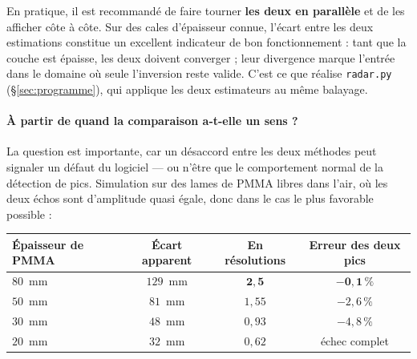 \documentclass[11pt,a4paper]{article}
\begin{document}
\begin{center}
\end{center}

\noindent
En pratique, il est recommandé de faire tourner \textbf{les deux en parallèle} et
de les afficher côte à côte. Sur des cales d'épaisseur connue, l'écart entre les
deux estimations constitue un excellent indicateur de bon fonctionnement : tant
que la couche est épaisse, les deux doivent converger ; leur divergence marque
l'entrée dans le domaine où seule l'inversion reste valide. C'est ce que réalise
\texttt{radar.py} (\S\ref{sec:programme}), qui applique les deux
estimateurs au même balayage.

\paragraph{À partir de quand la comparaison a-t-elle un sens ?} La question est
importante, car un désaccord entre les deux méthodes peut signaler un défaut du
logiciel --- ou n'être que le comportement normal de la détection de pics.
Simulation sur des lames de PMMA libres dans l'air, où les deux échos sont
d'amplitude quasi égale, donc dans le cas le plus favorable possible :

\begin{table}[h]
\centering
\begin{tabular}{lccc}
\toprule
Épaisseur de PMMA & Écart apparent & En résolutions & Erreur des deux pics \\
\midrule
$80$~mm & $129$~mm & $\mathbf{2{,}5}$ & $\mathbf{-0{,}1\,\%}$ \\
$50$~mm & $81$~mm & $1{,}55$ & $-2{,}6\,\%$ \\
$30$~mm & $48$~mm & $0{,}93$ & $-4{,}8\,\%$ \\
$20$~mm & $32$~mm & $0{,}62$ & échec complet \\
\bottomrule
\end{tabular}
\end{table}
\end{document}
